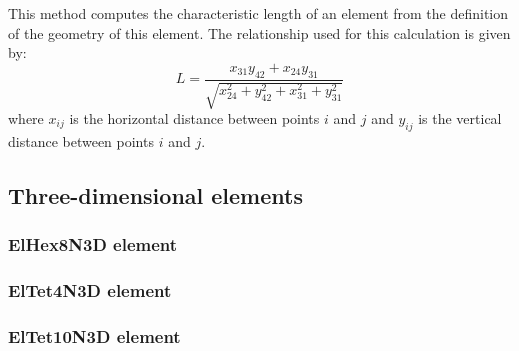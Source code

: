 This method computes the characteristic length of an element from the definition of the geometry of this element.
The relationship used for this calculation is given by:
\begin{equation}
L=\frac{x_{31} y_{42}+x_{24} y_{31}}{\sqrt{x_{24}^2+y_{42}^2+x_{31}^2+y_{31}^2}}
\end{equation}
where $x_{ij}$ is the horizontal distance between points $i$ and $j$ and $y_{ij}$ is the vertical distance between points $i$ and $j$.

\subsection{Three-dimensional elements}

\subsubsection{ElHex8N3D element}

\subsubsection{ElTet4N3D element}

\subsubsection{ElTet10N3D element}
